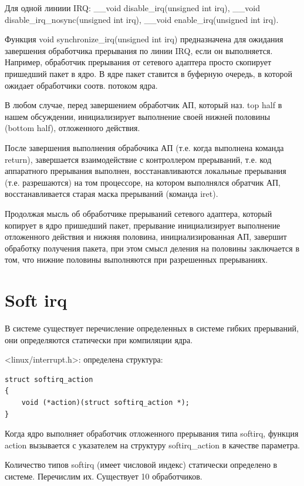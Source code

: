 \documentclass[12pt,a4paper]{scrreprt}
\begin{document}
Для одной линиии IRQ: \_\_void disable\_irq(unsigned int irq), \_\_void disable\_irq\_nosync(unsigned int irq), \_\_void enable\_irq(unsigned int irq).

Функция void synchronize\_irq(unsigned int irq) предназначена для ожидания завершения 
обработчика прерывания по линии IRQ, если он выполняется. Например, обработчик прерывания от сетевого адаптера просто скопирует пришедший пакет в ядро. В ядре пакет ставится в буферную очередь, в которой ожидает обработчики соотв. потоком ядра.

В любом случае, перед завершением обработчик АП, который наз. top half в нашем обсуждении,
инициализирует выполнение своей нижней половины (bottom half), отложенного действия. 

После завершения выполнения обрабочика АП (т.е. когда выполнена команда return), завершается взаимодействие с контроллером прерываний, т.е. код аппаратного прерывания выполнен, восстанавливаются локальные прерывания (т.е. разрешаются) на том процессоре, на котором выполнялся обратчик АП, восстанавливается старая маска прерываний (команда iret).

Продолжая мысль об обработчике прерываний сетевого адаптера, который копирует в ядро пришедший пакет, прерывание инициализирует выполнение отложенного действия и нижняя половина, инициализированная АП, завершит обработку получения пакета, при этом смысл деления на половины заключается в том, что нижние половины выполняются при разрешенных прерываниях.

\section{Soft irq}
	
В системе существует перечисление определенных в системе гибких прерываний, они определяются статически при компиляции ядра. 

<linux/interrupt.h>: определена структура:

\begin{lstlisting}
struct softirq_action
{
	void (*action)(struct softirq_action *);
}
\end{lstlisting}

Когда ядро выполняет обработчик отложенного прерывания типа softirq, функция action
вызывается с указателем на структуру softirq\_action в качестве параметра.

Количество типов softirq (имеет числовой индекс) статически определено в системе. Перечислим их. Существует 10 обработчиков.
\end{document}
